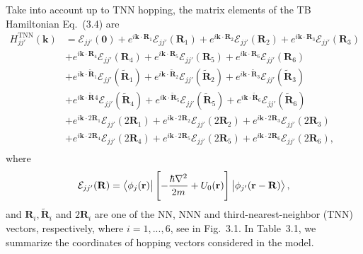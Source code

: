 Take into account up to \ac{TNN} hopping, the matrix elements of the \ac{TB} Hamiltonian Eq.~(3.4) are
\begin{equation}
	\begin{aligned}
		H_{jj'}^{\text{TNN}}(\mathbf{k})
		& = \mathcal{E}_{jj'}(\mathbf{0}) + e^{i\mathbf{k}\cdot \mathbf{R}_{1}}\mathcal{E}_{jj'}(\mathbf{R}_{1}) + e^{i\mathbf{k}\cdot \mathbf{R}_{2}}\mathcal{E}_{jj'}(\mathbf{R}_{2}) + e^{i\mathbf{k}\cdot \mathbf{R}_{3}}\mathcal{E}_{jj'}(\mathbf{R}_{3})                 \\
		& + e^{i\mathbf{k}\cdot \mathbf{R}_{4}}\mathcal{E}_{jj'}(\mathbf{R}_{4}) + e^{i\mathbf{k}\cdot \mathbf{R}_{5}}\mathcal{E}_{jj'}(\mathbf{R}_{5}) + e^{i\mathbf{k}\cdot \mathbf{R}_{6}}\mathcal{E}_{jj'}(\mathbf{R}_{6})                                                 \\
		& + e^{i\mathbf{k}\cdot \tilde{\mathbf{R}}_{1}}\mathcal{E}_{jj'}(\tilde{\mathbf{R}}_{1}) + e^{i\mathbf{k}\cdot \tilde{\mathbf{R}}_{2}}\mathcal{E}_{jj'}(\tilde{\mathbf{R}}_{2}) + e^{i\mathbf{k}\cdot \tilde{\mathbf{R}}_{3}}\mathcal{E}_{jj'}(\tilde{\mathbf{R}}_{3}) \\
		& + e^{i\mathbf{k}\cdot \tilde{\mathbf{R}}_{}4}\mathcal{E}_{jj'}(\tilde{\mathbf{R}}_{4}) + e^{i\mathbf{k}\cdot \tilde{\mathbf{R}}_{5}}\mathcal{E}_{jj'}(\tilde{\mathbf{R}}_{5}) + e^{i\mathbf{k}\cdot \tilde{\mathbf{R}}_{6}}\mathcal{E}_{jj'}(\tilde{\mathbf{R}}_{6}) \\
		& + e^{i\mathbf{k}\cdot 2\mathbf{R}_{1}}\mathcal{E}_{jj'}(2\mathbf{R}_{1}) + e^{i\mathbf{k}\cdot 2\mathbf{R}_{2}}\mathcal{E}_{jj'}(2\mathbf{R}_{2}) + e^{i\mathbf{k}\cdot 2\mathbf{R}_{3}}\mathcal{E}_{jj'}(2\mathbf{R}_{3})                                           \\
		& + e^{i\mathbf{k}\cdot 2\mathbf{R}_{4}}\mathcal{E}_{jj'}(2\mathbf{R}_{4}) + e^{i\mathbf{k}\cdot 2\mathbf{R}_{5}}\mathcal{E}_{jj'}(2\mathbf{R}_{5}) + e^{i\mathbf{k}\cdot 2\mathbf{R}_{6}}\mathcal{E}_{jj'}(2\mathbf{R}_{6}) ,                                          \\
	\end{aligned}
\end{equation}
where
\begin{gather}
	\mathcal{E}_{jj'}(\mathbf{R}) = \bra{\phi_{j}(\mathbf{r})} \left[-\frac{\hbar \nabla^{2}}{2m} + U_{0} (\mathbf{r})\right] \ket{\phi_{j'}(\mathbf{r-R})},
\end{gather}
and $\mathbf{R}_{i}, \tilde{\mathbf{R}}_{i}$ and $2\mathbf{R}_{i}$ are one of the \ac{NN}, \ac{NNN} and third-nearest-neighbor (TNN) vectors, respectively, where $i = 1,...,6$, see in Fig.~3.1. In Table~3.1, we summarize the coordinates of hopping vectors considered in the model.

